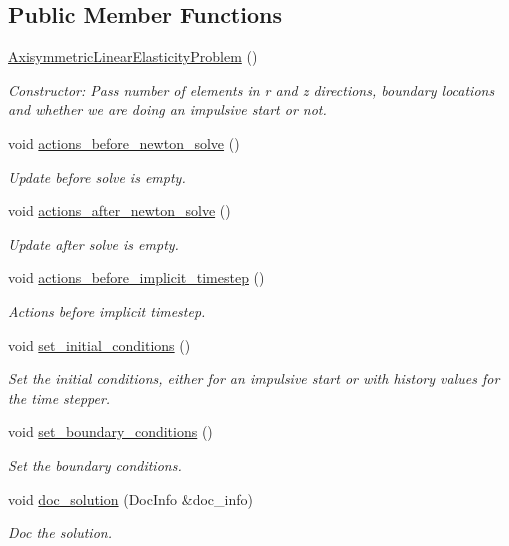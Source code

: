 \subsection*{Public Member Functions}
\begin{DoxyCompactItemize}
\item 
\hyperlink{classAxisymmetricLinearElasticityProblem_aaa4da18227b8b20dfba1f67bad4907ed}{Axisymmetric\+Linear\+Elasticity\+Problem} ()
\begin{DoxyCompactList}\small\item\em Constructor\+: Pass number of elements in r and z directions, boundary locations and whether we are doing an impulsive start or not. \end{DoxyCompactList}\item 
void \hyperlink{classAxisymmetricLinearElasticityProblem_a25da062bc76af5ef30619a3f3ff3718f}{actions\+\_\+before\+\_\+newton\+\_\+solve} ()
\begin{DoxyCompactList}\small\item\em Update before solve is empty. \end{DoxyCompactList}\item 
void \hyperlink{classAxisymmetricLinearElasticityProblem_af9b01e082da514668a89df9213afbbd5}{actions\+\_\+after\+\_\+newton\+\_\+solve} ()
\begin{DoxyCompactList}\small\item\em Update after solve is empty. \end{DoxyCompactList}\item 
void \hyperlink{classAxisymmetricLinearElasticityProblem_a6ea18ecd60fd5878522ae6024cb57dee}{actions\+\_\+before\+\_\+implicit\+\_\+timestep} ()
\begin{DoxyCompactList}\small\item\em Actions before implicit timestep. \end{DoxyCompactList}\item 
void \hyperlink{classAxisymmetricLinearElasticityProblem_a6b0263b6f783652a1d8151948f4b9430}{set\+\_\+initial\+\_\+conditions} ()
\begin{DoxyCompactList}\small\item\em Set the initial conditions, either for an impulsive start or with history values for the time stepper. \end{DoxyCompactList}\item 
void \hyperlink{classAxisymmetricLinearElasticityProblem_ad6419d0572a6e869a5b9ba3c5aac3144}{set\+\_\+boundary\+\_\+conditions} ()
\begin{DoxyCompactList}\small\item\em Set the boundary conditions. \end{DoxyCompactList}\item 
void \hyperlink{classAxisymmetricLinearElasticityProblem_a370b76b9e2902242de018339d3aedd04}{doc\+\_\+solution} (Doc\+Info \&doc\+\_\+info)
\begin{DoxyCompactList}\small\item\em Doc the solution. \end{DoxyCompactList}\end{DoxyCompactItemize}
